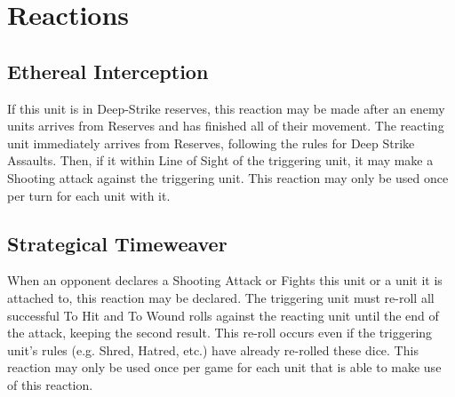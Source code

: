 \section{Reactions}

\subsection{Ethereal Interception} \label{Ethereal Interception}

If this unit is in Deep-Strike reserves, this reaction may be made after an enemy units arrives from Reserves and has finished all of their movement. The reacting unit immediately arrives from Reserves, following the rules for Deep Strike Assaults. Then, if it within Line of Sight of the triggering unit, it may make a Shooting attack against the triggering unit. This reaction may only be used once per turn for each unit with it. \\

\subsection{Strategical Timeweaver} \label{Strategical Timeweaver}

When an opponent declares a Shooting Attack or Fights this unit or a unit it is attached to, this reaction may be declared. The triggering unit must re-roll all successful To Hit and To Wound rolls against the reacting unit until the end of the attack, keeping the second result. This re-roll occurs even if the triggering unit's rules (e.g. Shred, Hatred, etc.) have already re-rolled these dice. This reaction may only be used once per game for each unit that is able to make use of this reaction.

